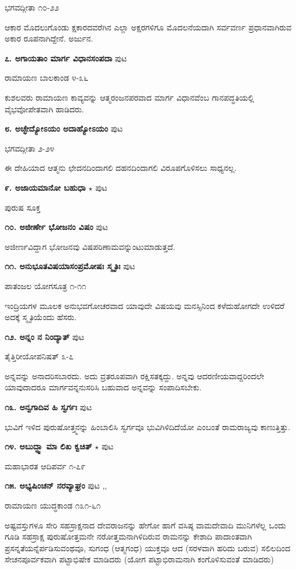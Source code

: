 \hfill ಭಗವದ್ಗೀತಾ ೧೦-೨೨

ಆಕಾರ ಮೊದಲುಗೊಂಡು ಕ್ಷಕಾರದವರೆಗಿನ ಎಲ್ಲಾ ಅಕ್ಷರಗಳಿಗೂ ಮೊದಲನೆಯದಾಗಿ ಸರ್ವವರ್ಣ ಪ್ರಧಾನವಾಗಿರುವ ಅಕಾರ ರೂಪನಾಗಿದ್ದೇನೆ. ಅರ್ಜುನ. 

\medskip
\noindent\textbf{೭. ಅಗಾಯತಾಂ ಮಾರ್ಗ ವಿಧಾನಸಂಪದಾ} \hfill ಪುಟ \pageref{188}

\hfill ರಾಮಾಯಣ ಬಾಲಕಾಂಡ ೪-೩೬

ಕುಶಲವರು ರಾಮಾಯಣ ಕಾವ್ಯವನ್ನು ಆತ್ಮರಂಜನಪರವಾದ ಮಾರ್ಗ ವಿಧಾನವೆಂಬ ಗಾನಪದ್ಧತಿಯಲ್ಲಿ ವೈಭವೋಪೇತವಾಗಿ ಹಾಡಿದರು.

\medskip
\noindent\textbf{೮. ಅಚ್ಛೇದ್ಯೋಽಯಂ ಅದಾಹ್ಯೋಽಯಂ } \hfill ಪುಟ \pageref{36}

\hfill ಭಗವದ್ಗೀತಾ ೨-೨೪

ಈ ದೇಹಿಯಾದ ಆತ್ಮನು ಛೇದನದಿಂದಾಗಲಿ ದಹನದಿಂದಾಗಲಿ ವಿರೂಪಗೊಳಿಸಲು ಸಾಧ್ಯನಲ್ಲ.

\medskip
\noindent\textbf{೯. ಅಜಾಯಮಾನೋ ಬಹುಧಾ} $\star$ \hfill ಪುಟ\pageref{150}

\hfill ಪುರುಷ ಸೂಕ್ತ

\medskip
\noindent\textbf{೧೦. ಅಜೀರ್ಣೇ ಭೋಜನಂ ವಿಷಂ } \hfill ಪುಟ \pageref{265}

\hfill ಅಜೀರ್ಣವಿದ್ದಾಗ ಭೋಜನವು ವಿಷಪರಿಣಾಮವನ್ನುಂಟುಮಾಡುತ್ತದೆ.

\medskip
\noindent\textbf{೧೧. ಅನುಭೂತವಿಷಯಾಸಂಪ್ರಮೋಷಃ ಸ್ಮೃತಿಃ} \hfill ಪುಟ \pageref{81}

\hfill ಪಾತಂಜಲ ಯೋಗಸೂತ್ರ ೧-೧೧

ಇಂದ್ರಿಯಗಳ ಮೂಲಕ ಅನುಭವಗೋಚರವಾದ ಯಾವುದೇ ವಿಷಯವು ಮನಸ್ಸಿನಿಂದ ಕಳೆದುಹೋಗದೇ ಉಳಿದರೆ ಅದಕ್ಕೆ ಸ್ಮೃತಿಯೆಂದು ಹೆಸರು.

\medskip
\noindent\textbf{೧೨. ಅನ್ನಂ ನ ನಿಂದ್ಯಾತ್} \hfill ಪುಟ \pageref{76}

\hfill ತೈತ್ತಿರೀಯೋಪನಿಷತ್ ೩-೭

ಅನ್ನವನ್ನು ಅನಾದರಿಸಬಾರದು. ಅದು ವ್ರತರೂಪವಾಗಿ ರಕ್ಷಿಸತಕ್ಕದ್ದು. ಅನ್ನವು ಆದರಣೀಯವಾದ್ದರಿಂದಲೇ ಯಾವುದಾದರೂ ಮಾರ್ಗವನ್ನನುಸರಿಸಿ ಬಹುವಾದ ಅನ್ನವನ್ನು ಸಂಪಾದಿಸಬೇಕು.

\medskip
\noindent\textbf{೧೩. ಅನ್ವಗಾದಿವ ಹಿ ಸ್ವರ್ಗಃ} \hfill ಪುಟ \pageref{252}

ಭುವಿಗೆ ಇಳಿದ ಪುರುಷೋತ್ತ್ಮನನ್ನು ಹಿಂಬಾಲಿಸಿ ಸ್ವರ್ಗವೂ ಭುವಿಗಿಳಿದಿದೆಯೋ ಎಂಬಂತೆ ರಾಮರಾಜ್ಯವು ಕಾಣುತ್ತಿತ್ತು.

\medskip
\noindent\textbf{೧೪. ಅಬುದ್ಧ್ವಾ ಮಾ ಲಿಖ ಕ್ವಚಿತ್ } $\star$ \hfill ಪುಟ \pageref{119}

\hfill ಮಹಾಭಾರತ ಆದಿಪರ್ವ ೧-೭೯

\medskip
\noindent\textbf{೧೫. ಅಭ್ಯಷಿಂಚನ್ ನರವ್ಯಾಘ್ರಂ} \hfill ಪುಟ \pageref{150},\pageref{208},\pageref{248}

\hfill ರಾಮಾಯಣ ಯುದ್ಧಕಾಂಡ ೧೩೧-೬೧

ಅಷ್ಟವಸ್ತುಗಳೂ ಸೇರಿ ಸಹಸ್ರಾಕ್ಷನಾದ ದೇವರಾಜನನ್ನು ಹೇಗೋ ಹಾಗೆ ವಸಿಷ್ಠ ವಾಮದೇವಾದಿ ಮುನಿಗಳೆಲ್ಲ ಒಂದು ಗೂಡಿ ಸಹಸ್ರಾಕ್ಷ ಪುರುಷೋತ್ತಮನೇ ನರೋತ್ತಮನಾಗಿಳಿದಿರುವ ರಾಮನನ್ನು ಕೇಶಾದಿ ಪಾದಾಂತವಾಗಿ ಪ್ರಸನ್ನತೆಯನ್ನೆರ್ಪಡಿಸುವಂಥವೂ, ಸುಗಂಧ (ಆತ್ಮಗಂಧ) ಯುಕ್ತವೂ ಆದ (ಸರಳವಾಗಿ ಹರಿದು ಬರುವ) ಸಲಿಲದಿಂದ ಸೇಚನಪೂರ್ವಕವಾಗಿ ಪಟ್ಟಾಭಿಷೇಕ ಮಾಡಿದರು (ಯೋಗ ಪಟ್ಟಾಭಿರಾಮನಾಗಿ ಕಂಗೊಳಿಸುವಂತೆ ಮಾಡಿದರು)


